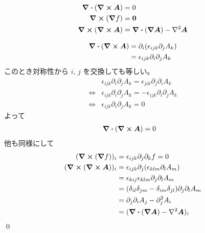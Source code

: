 \documentclass[uplatex,dvipdfmx,a4paper,11pt]{jlreq}
\makeatletter
\newcommand{\rot}{\curl}
\theoremstyle{definition}
\renewenvironment{proof}[1][\proofname]{\par
  \normalfont
  \topsep6\p@\@plus6\p@ \trivlist
  \item[\hskip\labelsep{\bfseries #1}\@addpunct{\bfseries}]\ignorespaces\quad\par
}{%
  \qed\endtrivlist\@endpefalse
}
\renewcommand\proofname{証明}
\makeatother
\begin{document}
\begin{theorem}
  \begin{align}
    \div{(\rot{\bm{A}})} & = 0                                          \\
    \rot{(\grad{f})}     & = \bm{0}                                     \\
    \rot{(\rot{\bm{A}})} & = \div{(\grad{\bm{A}})} - \laplacian{\bm{A}}
  \end{align}
\end{theorem}
\begin{proof}
  \begin{align}
    \div{(\rot{\bm{A}})} & = \partial_i(\epsilon_{ijk}\partial_jA_k) \\
                         & = \epsilon_{ijk}\partial_i\partial_jA_k
  \end{align}
  このとき対称性から $i$, $j$ を交換しても等しい。
  \begin{align}
         & \epsilon_{ijk}\partial_i\partial_jA_k = \epsilon_{jik}\partial_j\partial_iA_k  \\
    \iff & \epsilon_{ijk}\partial_i\partial_jA_k = -\epsilon_{ijk}\partial_i\partial_jA_k \\
    \iff & \epsilon_{ijk}\partial_i\partial_jA_k = 0
  \end{align}
  よって
  \begin{align}
    \div{(\rot{\bm{A}})} & = 0
  \end{align}
  他も同様にして
  \begin{align}
    (\rot{(\grad{f})})_i     & = \epsilon_{ijk}\partial_j\partial_kf = 0                                  \\
    (\rot{(\rot{\bm{A}})})_i & = \epsilon_{ijk}\partial_j(\epsilon_{klm}\partial_lA_m)                    \\
                             & = \epsilon_{kij}\epsilon_{klm}\partial_j\partial_lA_m                      \\
                             & = (\delta_{il}\delta_{jm} - \delta_{im}\delta_{jl})\partial_j\partial_lA_m \\
                             & = \partial_j\partial_iA_j - \partial_j^2A_i                                \\
                             & = (\div{(\grad{\bm{A}})} - \laplacian{\bm{A}})_i
  \end{align}
\end{proof}
\end{document}
